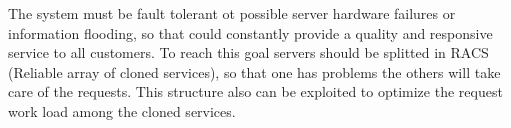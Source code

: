 The system must be fault tolerant ot possible server hardware failures or information flooding, so that could constantly provide a quality and responsive service to all customers. To reach this goal servers should be splitted in RACS (Reliable array of cloned services), so that one has problems the others will take care of the requests. This structure also can be exploited to optimize the request work load among the cloned services.